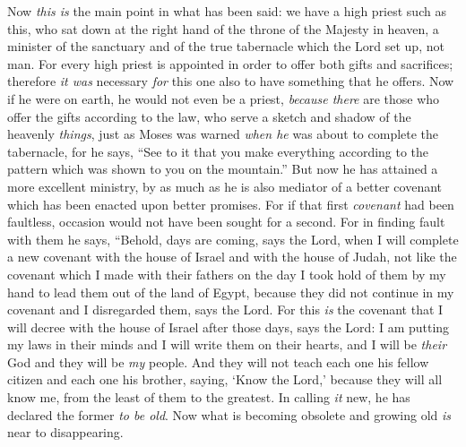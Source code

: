 \begin{biblechapter} %
 Now \textit{this is} the main point in what has been said: we have a high priest such as this, who sat down at the right hand of the throne of the Majesty in heaven,
\verse a minister of the sanctuary and of the true tabernacle which the Lord set up, not man.
\verse For every high priest is appointed in order to offer both gifts and sacrifices; therefore \textit{it was} necessary \textit{for} this one also to have something that he offers.
\verse Now if he were on earth, he would not even be a priest, \textit{because there} are those who offer the gifts according to the law,
\verse who serve a sketch and shadow of the heavenly \textit{things}, just as Moses was warned \textit{when he} was about to complete the tabernacle, for he says, “See to it that you make everything according to the pattern which was shown to you on the mountain.”
\verse But now he has attained a more excellent ministry, by as much as he is also mediator of a better covenant which has been enacted upon better promises.
\verse For if that first \textit{covenant} had been faultless, occasion would not have been sought for a second.
\verse For in finding fault with them he says,
\verse “Behold, days are coming, says the Lord, 
when I will complete a new covenant with the house of Israel 
and with the house of Judah,
\verse not like the covenant which I made with their fathers 
on the day I took hold of them by my hand 
to lead them out of the land of Egypt, 
because they did not continue in my covenant 
and I disregarded them, says the Lord.
\verse For this \textit{is} the covenant that I will decree with the house of Israel 
after those days, says the Lord: 
I am putting my laws in their minds 
and I will write them on their hearts, 
and I will be \textit{their} God 
and they will be \textit{my} people.
\verse And they will not teach each one his fellow citizen 
and each one his brother, saying, ‘Know the Lord,’ 
because they will all know me, 
from the least of them to the greatest.
\verse In calling \textit{it} new, he has declared the former \textit{to be old}. Now what is becoming obsolete and growing old \textit{is} near to disappearing.
\end{biblechapter}

